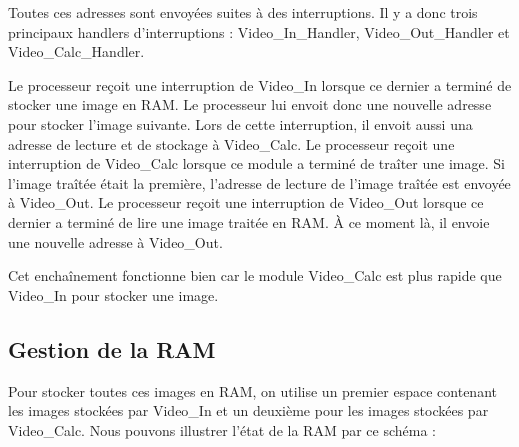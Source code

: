 \documentclass[a4paper,12pt]{report}
\begin{document}
{{{Toutes ces adresses sont envoyées suites à des interruptions.
Il y a donc trois principaux handlers d'interruptions : Video\_In\_Handler, Video\_Out\_Handler et Video\_Calc\_Handler.

Le processeur reçoit une interruption de Video\_In lorsque ce dernier a terminé de stocker une image en RAM. Le processeur lui envoit donc une nouvelle adresse pour stocker l'image suivante. Lors de cette interruption, il envoit aussi una adresse de lecture et de stockage à Video\_Calc.
Le processeur reçoit une interruption de Video\_Calc lorsque ce module a terminé de traîter une image. Si l'image traîtée était la première, l'adresse de lecture de l'image traîtée est envoyée à Video\_Out.
Le processeur reçoit une interruption de Video\_Out lorsque ce dernier a terminé de lire une image traitée en RAM. À ce moment là, il envoie une nouvelle adresse à Video\_Out.

Cet enchaînement fonctionne bien car le module Video\_Calc est plus rapide que Video\_In pour stocker une image.
}
			\subsection*{Gestion de la RAM}
{
	Pour stocker toutes ces images en RAM, on utilise un premier espace contenant les images stockées par Video\_In et un deuxième pour les images stockées par Video\_Calc. Nous pouvons illustrer l'état de la RAM par ce schéma :

}}}
\end{document}
